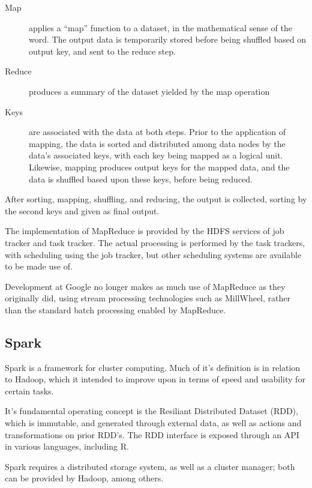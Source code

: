 \documentclass[a4paper,10pt]{article}
\begin{document}
\begin{description}
	\item[Map] applies a ``map'' function to a dataset, in the
	      mathematical sense of the word. The output data is temporarily
	      stored before being shuffled based on output key, and sent to the
	      reduce step.
	\item[Reduce] produces a summary of the dataset yielded by the map operation
	\item[Keys] are associated with the data at both steps. Prior to the
	      application of mapping, the data is sorted and distributed among
	      data nodes by the data's associated keys, with each key being mapped
	      as a logical unit. Likewise, mapping produces output keys for the
	      mapped data, and the data is shuffled based upon these keys, before
	      being reduced.
\end{description}

After sorting, mapping, shuffling, and reducing, the output is
collected, sorting by the second keys and given as final output.

The implementation of MapReduce is provided by the HDFS services of
job tracker and task tracker. The actual processing is performed by
the task trackers, with scheduling using the job tracker, but other
scheduling systems are available to be made use of.

Development at Google no longer makes as much use of MapReduce as they
originally did, using stream processing technologies such as
MillWheel, rather than the standard batch processing enabled by
MapReduce\cite{akidau2013millwheel}.

\subsection{Spark}
\label{sec:spark}

Spark is a framework for cluster computing\cite{zaharia2010spark}. Much of it's definition is
in relation to Hadoop, which it intended to improve upon in terms of
speed and usability for certain tasks.

It's fundamental operating concept is the Resiliant Distributed
Dataset (RDD), which is immutable, and generated through external
data, as well as actions and transformations on prior RDD's. The RDD
interface is exposed through an API in various languages, including R.

Spark requires a distributed storage system, as well as a cluster
manager; both can be provided by Hadoop, among others.
\end{document}
